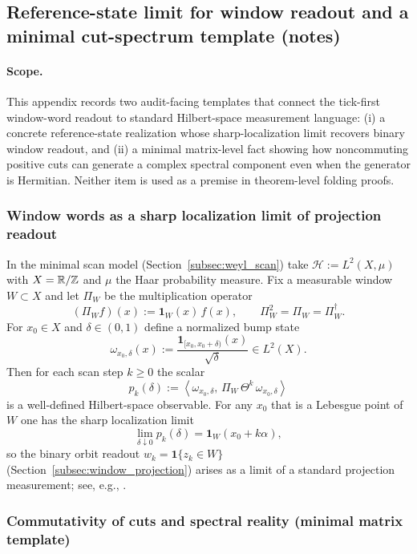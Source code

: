 \subsection{Reference-state limit for window readout and a minimal cut-spectrum template (notes)}
\label{app:reference_state_and_cuts}

\paragraph{Scope.}
\AuditTag This appendix records two audit-facing templates that connect the tick-first window-word readout to standard Hilbert-space measurement language:
(i) a concrete reference-state realization whose sharp-localization limit recovers binary window readout,
and (ii) a minimal matrix-level fact showing how noncommuting positive cuts can generate a complex spectral component even when the generator is Hermitian.
Neither item is used as a premise in theorem-level folding proofs.

\subsubsection{Window words as a sharp localization limit of projection readout}
\label{subsec:reference_state_window_limit}

\InterfaceTag In the minimal scan model (Section~\ref{subsec:weyl_scan}) take $\mathcal{H}:=L^2(X,\mu)$ with $X=\mathbb{R}/\mathbb{Z}$ and $\mu$ the Haar probability measure.
Fix a measurable window $W\subset X$ and let $\Pi_W$ be the multiplication operator
\[
(\Pi_W f)(x):=\mathbf{1}_W(x)\,f(x),
\qquad
\Pi_W^2=\Pi_W=\Pi_W^\dagger.
\]
For $x_0\in X$ and $\delta\in(0,1)$ define a normalized bump state
\[
\omega_{x_0,\delta}(x):=\frac{\mathbf{1}_{[x_0,x_0+\delta)}(x)}{\sqrt{\delta}}\in L^2(X).
\]
Then for each scan step $k\ge 0$ the scalar
\[
p_k(\delta):=\left\langle \omega_{x_0,\delta},\,\Pi_W\,\Theta^k\,\omega_{x_0,\delta}\right\rangle
\]
is a well-defined Hilbert-space observable.
\AuditTag For any $x_0$ that is a Lebesgue point of $W$ one has the sharp localization limit
\[
\lim_{\delta\downarrow 0} p_k(\delta)=\mathbf{1}_W(x_0+k\alpha),
\]
so the binary orbit readout $w_k=\mathbf{1}\{z_k\in W\}$ (Section~\ref{subsec:window_projection}) arises as a limit of a standard projection measurement; see, e.g., \cite{SteinShakarchi2005}.

\subsubsection{Commutativity of cuts and spectral reality (minimal matrix template)}
\label{subsec:cuts_commutativity_spectrum_template}

